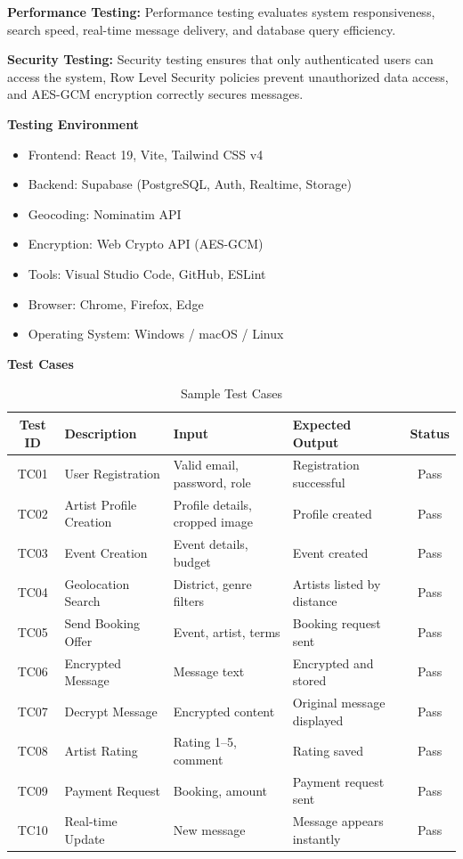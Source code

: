 \documentclass[12pt,a4paper]{report}
\begin{document}
\vspace{0.3cm}

\textbf{Performance Testing:}
Performance testing evaluates system responsiveness, search speed, real-time message delivery, and database query efficiency.

\vspace{0.3cm}

\textbf{Security Testing:}
Security testing ensures that only authenticated users can access the system, Row Level Security policies prevent unauthorized data access, and AES-GCM encryption correctly secures messages.

\textbf{Testing Environment}

\begin{itemize}
\item Frontend: React 19, Vite, Tailwind CSS v4
\item Backend: Supabase (PostgreSQL, Auth, Realtime, Storage)
\item Geocoding: Nominatim API
\item Encryption: Web Crypto API (AES-GCM)
\item Tools: Visual Studio Code, GitHub, ESLint
\item Browser: Chrome, Firefox, Edge
\item Operating System: Windows / macOS / Linux
\end{itemize}

\textbf{Test Cases}

\begin{table}[htbp]
\setcounter{table}{0}
\centering
\caption{Sample Test Cases}
\renewcommand{\arraystretch}{1.3}
\setlength{\tabcolsep}{6pt}
\begin{tabular}{|c|p{3.5cm}|p{3cm}|p{3.5cm}|c|}
\hline
\textbf{Test ID} & \textbf{Description} & \textbf{Input} & \textbf{Expected Output} & \textbf{Status} \\
\hline
TC01 & User Registration & Valid email, password, role & Registration successful & Pass \\
\hline
TC02 & Artist Profile Creation & Profile details, cropped image & Profile created & Pass \\
\hline
TC03 & Event Creation & Event details, budget & Event created & Pass \\
\hline
TC04 & Geolocation Search & District, genre filters & Artists listed by distance & Pass \\
\hline
TC05 & Send Booking Offer & Event, artist, terms & Booking request sent & Pass \\
\hline
TC06 & Encrypted Message & Message text & Encrypted and stored & Pass \\
\hline
TC07 & Decrypt Message & Encrypted content & Original message displayed & Pass \\
\hline
TC08 & Artist Rating & Rating 1--5, comment & Rating saved & Pass \\
\hline
TC09 & Payment Request & Booking, amount & Payment request sent & Pass \\
\hline
TC10 & Real-time Update & New message & Message appears instantly & Pass \\
\hline
\end{tabular}
\end{table}
\end{document}
